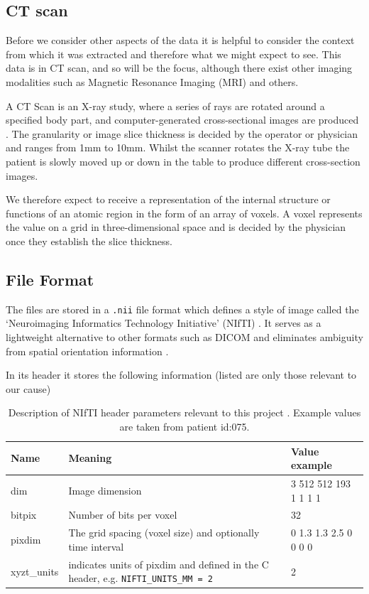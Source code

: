 \documentclass[11pt,twoside]{report}
\begin{document}
\subsection{CT scan}\label{sec:data-ct-scan}

Before we consider other aspects of the data it is helpful to consider the context from which it was extracted and therefore what we might expect to see. This data is in CT scan, and so will be the focus, although there exist other imaging modalities such as Magnetic Resonance Imaging (MRI) and others.

A CT Scan is an X-ray study, where a series of rays are rotated around a specified body part, and computer-generated cross-sectional images are produced \cite{file-formats}. The granularity or image slice thickness is decided by the operator or physician and ranges from 1mm to 10mm. Whilst the scanner rotates the X-ray tube the patient is slowly moved up or down in the table to produce different cross-section images. 
 
We therefore expect to receive a representation of the internal structure or functions of an atomic region in the form of an array of voxels. A voxel represents the value on a grid in three-dimensional space and is decided by the physician once they establish the slice thickness.

\subsection{File Format}\label{sec:data-file-format}

The files are stored in a \texttt{.nii} file format which defines a style of image called the `Neuroimaging Informatics Technology Initiative' (NIfTI) \cite{file-formats}. It serves as a lightweight alternative to other formats such as DICOM and eliminates ambiguity from spatial orientation information \cite{dicom-to-nifti-conversion}.

In its header it stores the following information (listed are only those relevant to our cause)

\begin{table}[ht]
  \centering
  \begin{tabular}{>{\raggedright}p{1.5cm}p{8cm}p{4cm}}
      \toprule
      \textbf{Name} & \textbf{Meaning} & \textbf{Value example} \\
      \midrule
      dim & Image dimension & 3 512 512 193 1 1 1 1 \\
      bitpix & Number of bits per voxel & 32 \\
      pixdim & The grid spacing (voxel size) and optionally time interval & 0 1.3 1.3 2.5 0 0 0 0 \\
      xyzt\_units & indicates units of pixdim and defined in the C header, e.g. \texttt{NIFTI\_UNITS\_MM = 2} & 2 \\
      \bottomrule
  \end{tabular}
  \caption{Description of NIfTI header parameters relevant to this project \cite{dicom-to-nifti-conversion, nifti-headers, nifti-data-format}. Example values are taken from patient id:075.}
  \label{tab:nifti-header}
\end{table}
\end{document}
